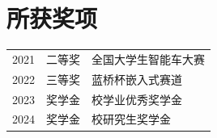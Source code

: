 \documentclass[]{deedy-resume-openfont}
\begin{document}
\begin{minipage}[t]{0.73\textwidth}

\section{所获奖项} 
\begin{tabular}{rll}
2021         & 二等奖  & 全国大学生智能车大赛 \\
2022	     & 三等奖  & 蓝桥杯嵌入式赛道 \\
2023         & 奖学金  & 校学业优秀奖学金\\
2024	     & 奖学金  & 校研究生奖学金 \\
\end{tabular}
\sectionsep


% 
% 

\end{minipage} 
\end{document}
